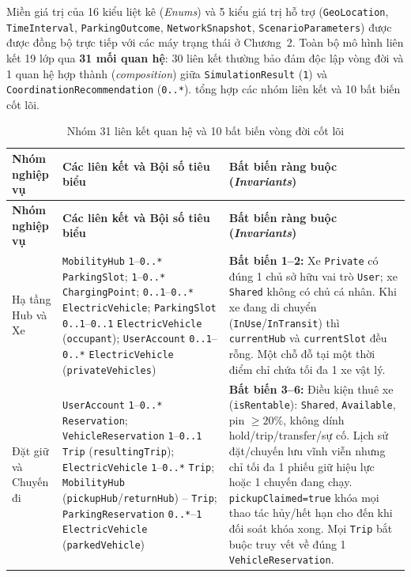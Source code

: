 Miền giá trị của 16 kiểu liệt kê (\textit{Enums}) và 5 kiểu giá trị hỗ trợ (\texttt{GeoLocation}, \texttt{TimeInterval}, \texttt{ParkingOutcome}, \texttt{NetworkSnapshot}, \texttt{ScenarioParameters}) được được đồng bộ trực tiếp với các máy trạng thái ở Chương~2. Toàn bộ mô hình liên kết 19 lớp qua \textbf{31 mối quan hệ}: 30 liên kết thường bảo đảm độc lập vòng đời và 1 quan hệ hợp thành (\textit{composition}) giữa \texttt{SimulationResult} (\texttt{1}) và \texttt{CoordinationRecommendation} (\texttt{0..*}).  tổng hợp các nhóm liên kết và 10 bất biến cốt lõi.

\begin{longtable}{>{\raggedright\arraybackslash}p{3.4cm} >{\raggedright\arraybackslash}p{4.8cm} >{\raggedright\arraybackslash}p{6.0cm}}
\caption{Nhóm 31 liên kết quan hệ và 10 bất biến vòng đời cốt lõi} \label{tab:associations-invariants} \\
\toprule
\textbf{Nhóm nghiệp vụ} & \textbf{Các liên kết và Bội số tiêu biểu} & \textbf{Bất biến ràng buộc (\textit{Invariants})} \\
\midrule
\endfirsthead
\toprule
\textbf{Nhóm nghiệp vụ} & \textbf{Các liên kết và Bội số tiêu biểu} & \textbf{Bất biến ràng buộc (\textit{Invariants})} \\
\midrule
\endhead
\bottomrule
\endfoot
Hạ tầng Hub và Xe & \texttt{MobilityHub} \texttt{1}--\texttt{0..*} \texttt{ParkingSlot}; \texttt{1}--\texttt{0..*} \texttt{ChargingPoint}; \texttt{0..1}--\texttt{0..*} \texttt{ElectricVehicle}; \texttt{ParkingSlot} \texttt{0..1}--\texttt{0..1} \texttt{ElectricVehicle} (\texttt{occupant}); \texttt{UserAccount} \texttt{0..1}--\texttt{0..*} \texttt{ElectricVehicle} (\texttt{privateVehicles}) & \textbf{Bất biến 1--2:} Xe \texttt{Private} có đúng 1 chủ sở hữu vai trò \texttt{User}; xe \texttt{Shared} không có chủ cá nhân. Khi xe đang di chuyển (\texttt{InUse}/\texttt{InTransit}) thì \texttt{currentHub} và \texttt{currentSlot} đều rỗng. Một chỗ đỗ tại một thời điểm chỉ chứa tối đa 1 xe vật lý. \\
\midrule
Đặt giữ và Chuyến đi & \texttt{UserAccount} \texttt{1}--\texttt{0..*} \texttt{Reservation}; \texttt{VehicleReservation} \texttt{1}--\texttt{0..1} \texttt{Trip} (\texttt{resultingTrip}); \texttt{ElectricVehicle} \texttt{1}--\texttt{0..*} \texttt{Trip}; \texttt{MobilityHub} (\texttt{pickupHub}/\texttt{returnHub}) -- \texttt{Trip}; \texttt{ParkingReservation} \texttt{0..*}--\texttt{1} \texttt{ElectricVehicle} (\texttt{parkedVehicle}) & \textbf{Bất biến 3--6:} Điều kiện thuê xe (\texttt{isRentable}): \texttt{Shared}, \texttt{Available}, pin $\ge 20\%$, không dính hold/trip/transfer/sự cố. Lịch sử đặt/chuyến lưu vĩnh viễn nhưng chỉ tối đa 1 phiếu giữ hiệu lực hoặc 1 chuyến đang chạy. \texttt{pickupClaimed=true} khóa mọi thao tác hủy/hết hạn cho đến khi đối soát khóa xong. Mọi \texttt{Trip} bắt buộc truy vết về đúng 1 \texttt{VehicleReservation}. \\

\end{longtable}
